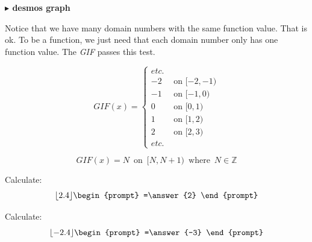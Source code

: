 \documentclass{ximera}
\begin{document}
\begin{example}
\begin{image}
\end{image}





\begin{onlineOnly}
\textbf{\textcolor{blue!55!black}{$\blacktriangleright$ desmos graph}} 
\begin{center}
\end{center}
\end{onlineOnly}



\end{example}

Notice that we have many domain numbers with the same function value. That is ok. To be a function, we just need that each domain number only has one function value.  The \textit{GIF} passes this test.






\[
GIF(x) = 
\begin{cases}
   etc. &    \\
  -2 & \text{ on } [-2, -1) \\
  -1 & \text{ on } [-1, 0) \\ 
   0 & \text{ on } [0, 1) \\
  1 & \text{ on } [1, 2) \\
   2 & \text{ on } [2, 3) \\
  etc. &  
\end{cases}
\]


\[
GIF(x) = N \, \text{ on } \, [N, N+1) \, \text{ where } \, N \in \mathbb{Z}
\]


\begin{question}
  Calculate:
  \[
  \lfloor 2.4 \rfloor
  \begin{prompt}
    =\answer{2}
  \end{prompt}
  \]
  \end{question}

  \begin{question}
  Calculate:
  \[
  \lfloor -2.4 \rfloor
  \begin{prompt}
    =\answer{-3}
  \end{prompt}
  \]
\end{question}
\end{document}
